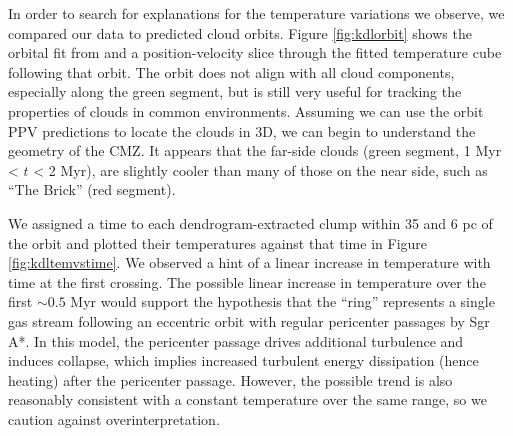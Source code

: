 In order to search for explanations for the temperature variations we observe,
we compared our data to predicted cloud orbits.  Figure \ref{fig:kdlorbit} shows
the orbital fit from \citet{Kruijssen2015a} and a position-velocity slice
through the fitted temperature cube following that orbit.  The orbit does not
align with all cloud components, especially along the green segment, but is still
very useful for
tracking the properties of clouds in common environments.  Assuming we can use
the orbit PPV predictions to locate the clouds in 3D, we can begin to
understand the geometry of the CMZ.  It appears that the
far-side clouds (green segment, 1 Myr < $t$ < 2 Myr), are slightly cooler
than many of those on the near side, such as ``The Brick'' (red segment).  


We assigned a time to each dendrogram-extracted clump within 35 \kms and 6 pc
of the \citet{Kruijssen2015a} orbit and plotted their temperatures against that
time in Figure \ref{fig:kdltemvstime}.  We observed a hint of a linear increase
in temperature with time at the first crossing.  The possible linear increase
in temperature over the first $\sim0.5$ Myr would support the
\citet{Kruijssen2015a} hypothesis that the ``ring'' represents a single gas
stream following an eccentric orbit with regular pericenter passages by Sgr A*.
In this model, the pericenter passage drives additional turbulence and induces
collapse, which implies increased turbulent energy dissipation (hence heating)
after the pericenter passage.  However, the possible trend is also reasonably
consistent with a constant temperature over the same range, so we caution
against overinterpretation. 

